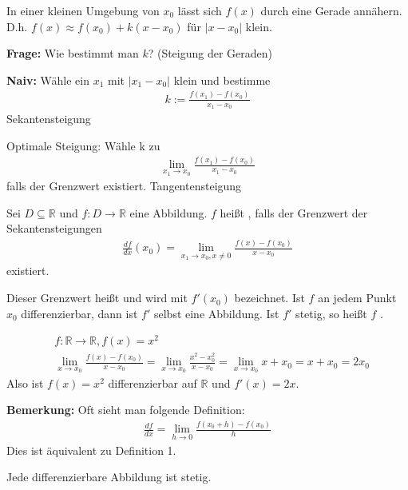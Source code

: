 In einer kleinen Umgebung von $x_0$ lässt sich $f(x)$ durch eine Gerade annähern. D.h. $f(x) \approx f(x_0) + k (x-x_0)$ für $|x-x_0|$ \glqq{}klein\grqq{}.

\bigskip
\textbf{Frage:} Wie bestimmt man $k$? (Steigung der Geraden)

\smallskip
\textbf{Naiv:} Wähle ein $x_1$ mit $|x_1 - x_0|$ klein und bestimme
\begin{align*}
    k := \frac{f(x_1) - f(x_0)}{x_1 - x_0}
\end{align*}
\glqq{}Sekantensteigung\grqq{}

\medskip
Optimale Steigung: Wähle k zu
\begin{align*}
    \lim\limits_{x_1 \to x_0} \frac{f(x_1) - f(x_0)}{x_1 - x_0}
\end{align*}
falls der Grenzwert existiert. \glqq{}Tangentensteigung\grqq{}

 Sei $D \subseteq \mathbb{R}$ und $f : D \rightarrow \mathbb{R}$ eine Abbildung. $f$ heißt , falls der Grenzwert der Sekantensteigungen
\begin{align*}
    \frac{df}{dx} (x_0) = \lim\limits_{x_1 \to x_0, x \neq 0} \frac{f(x) - f(x_0)}{x-x_0}
\end{align*}
existiert.

Dieser Grenzwert heißt  und wird mit $f'(x_0)$ bezeichnet. Ist $f$ an jedem Punkt $x_0$ differenzierbar, dann ist $f'$ selbst eine Abbildung. Ist $f'$ stetig, so heißt $f$ .

\begin{align*}
    &f : \mathbb{R} \rightarrow \mathbb{R}, f(x) = x^2 \\
    &\lim\limits_{x \to x_0} \frac{f(x) - f(x_0)}{x-x_0} = \lim\limits_{x \to x_0} \frac{x^2 - x_0^2}{x-x_0} = \lim\limits_{x \to x_0} x+x_0 = x+x_0 = 2x_0
\end{align*}
Also ist $f(x) = x^2$ differenzierbar auf $\mathbb{R}$ und $f'(x) = 2x$.

\medskip
\textbf{Bemerkung:} Oft sieht man folgende Definition:
\begin{align*}
    \frac{df}{dx} = \lim\limits_{h \to 0} \frac{f(x_0+h)-f(x_0)}{h}
\end{align*}
Dies ist äquivalent zu Definition 1.

Jede differenzierbare Abbildung ist stetig.

